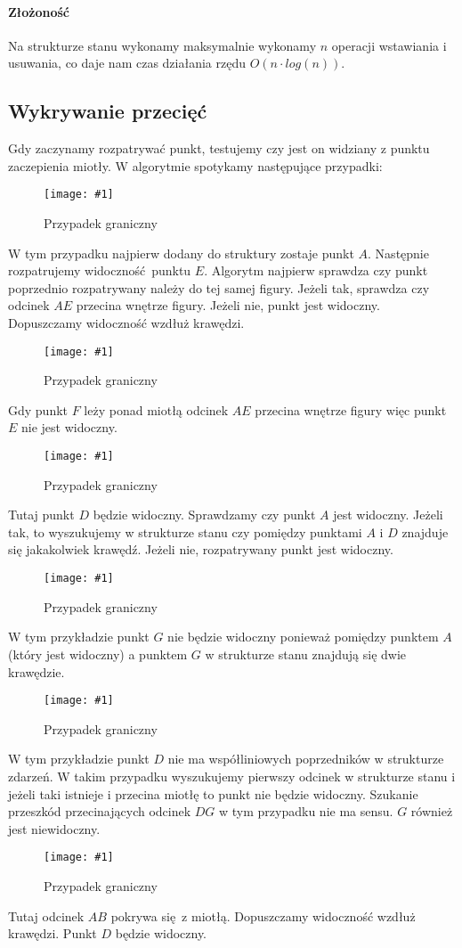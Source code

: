 \documentclass[12pt]{article}
\newcommand{\imgcustomsize}[3]{
	\begin{figure}[H]
		\centering
		\texttt{[image: \#1]}
		\caption{#2}
		\label{#1}
	\end{figure}
}
\newcommand{\img}[2]{\imgcustomsize{#1}{#2}{0.5}}
\begin{document}
			\paragraph{Złożoność}
				Na strukturze stanu wykonamy maksymalnie wykonamy $ n $ operacji wstawiania i usuwania, co daje nam czas działania rzędu $ O(n \cdot log(n)) $.
		
		\subsection{Wykrywanie przecięć}
			Gdy zaczynamy rozpatrywać punkt, testujemy czy jest on widziany z punktu zaczepienia miotły.  W algorytmie spotykamy następujące przypadki:
			
			\img{przyp1.jpg}{Przypadek graniczny}
				W tym przypadku najpierw dodany do struktury zostaje punkt $ A $. Następnie rozpatrujemy widoczność punktu $ E $. Algorytm najpierw sprawdza czy punkt poprzednio rozpatrywany należy do tej samej figury. Jeżeli tak, sprawdza czy odcinek $ AE $ przecina wnętrze figury. Jeżeli nie, punkt jest widoczny. Dopuszczamy widoczność wzdłuż krawędzi.
				
			\img{przyp2.jpg}{Przypadek graniczny}
				Gdy punkt $ F $ leży ponad miotłą odcinek $ AE $ przecina wnętrze figury więc punkt $ E $ nie jest widoczny.
			
			\img{przyp3.jpg}{Przypadek graniczny}
				Tutaj punkt $ D $ będzie widoczny. Sprawdzamy czy punkt $ A $ jest widoczny. Jeżeli tak, to wyszukujemy w strukturze stanu czy pomiędzy punktami $ A $ i $ D $ znajduje się jakakolwiek krawędź. Jeżeli nie, rozpatrywany punkt jest widoczny.
				
			\img{przyp4.jpg}{Przypadek graniczny}
				W tym przykładzie punkt $ G $ nie będzie widoczny ponieważ pomiędzy punktem $ A $ (który jest widoczny) a punktem $ G $ w strukturze stanu znajdują się dwie krawędzie.
				
			\img{przyp5.jpg}{Przypadek graniczny}
				W tym przykładzie punkt $ D $ nie ma współliniowych poprzedników w strukturze zdarzeń. W takim przypadku wyszukujemy pierwszy odcinek w strukturze stanu i jeżeli taki istnieje i przecina miotłę to punkt nie będzie widoczny. Szukanie przeszkód przecinających odcinek $ DG $ w tym przypadku nie ma sensu. $ G $ również jest niewidoczny.
			
			\img{przyp6.jpg}{Przypadek graniczny}
				Tutaj odcinek $ AB $ pokrywa się z miotłą. Dopuszczamy widoczność wzdłuż krawędzi. Punkt $ D $ będzie widoczny.
			
	

	
\end{document}
